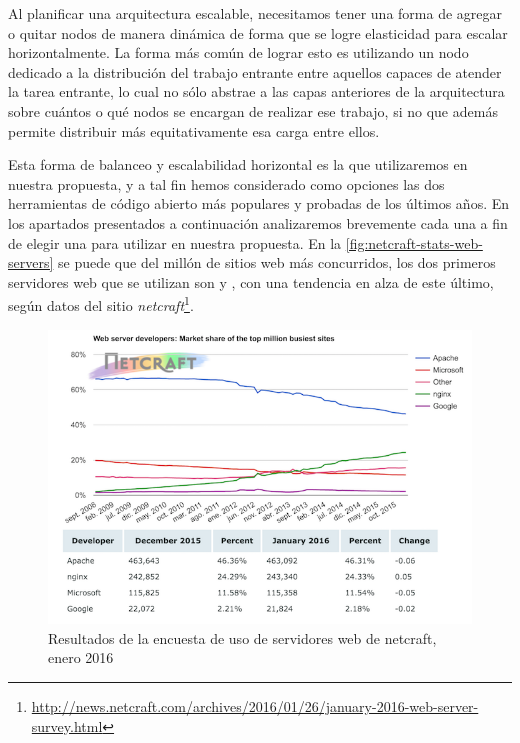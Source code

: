 Al planificar una arquitectura escalable, necesitamos tener una forma de agregar o quitar nodos de manera dinámica de forma que se logre elasticidad para escalar horizontalmente. La forma más común de lograr esto es utilizando un nodo dedicado a la distribución del trabajo entrante entre aquellos capaces de atender la tarea entrante, lo cual no sólo abstrae a las capas anteriores de la arquitectura sobre cuántos o qué nodos se encargan de realizar ese trabajo, si no que además permite distribuir más equitativamente esa carga entre ellos.

Esta forma de balanceo y escalabilidad horizontal es la que utilizaremos en nuestra propuesta, y a tal fin hemos considerado como opciones las dos herramientas de código abierto más populares y probadas de los últimos años. En los apartados presentados a continuación analizaremos brevemente cada una a fin de elegir una para utilizar en nuestra propuesta. En la \autoref{fig:netcraft-stats-web-servers} se puede que del millón de sitios web más concurridos, los dos primeros servidores web que se utilizan son  y , con una tendencia en alza de este último, según datos del sitio \textit{netcraft}\footnote{\url{http://news.netcraft.com/archives/2016/01/26/january-2016-web-server-survey.html}}.

\begin{figure}[H]
  \includegraphics[width=\linewidth]{src/images/03-capitulo-3/tecnologias/balanceo/stats.png}
  \caption{Resultados de la encuesta de uso de servidores web de netcraft, enero 2016}
  \label{fig:netcraft-stats-web-servers}
\end{figure}
